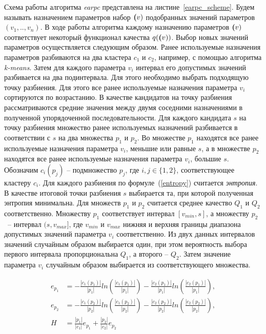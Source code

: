 Схема работы алгоритма \textit{earpc} представлена на листине~\ref{earpc_scheme}. Будем называть назначением параметров набор $\textbf(v)$ подобранных значений параметров $(v_1, .., v_n)$. В ходе работы алгоритма каждому назначению параметров $\textbf(v)$ соответствует некоторый функционал качества $q(\textbf(v))$. Выбор новых значений параметров осуществляется следующим образом. Ранее используемые назначения параметров разбиваются на два кластера $c_1$ и $c_2$, например, с помощью алгоритма \textit{k-means}. Затем для каждого параметра $v_i$ интервал его допустимых значений разбивается на два подинтервала. Для этого необходимо выбрать подходящую точку разбиения. Для этого все ранее используемые назначения параметра $v_i$ сортируются по возрастанию. В качестве кандидатов на точку разбиения рассматриваются средние значения между двумя соседними назначениями в полученной упорядоченной последовательности. Для каждого кандидата $s$ на точку разбиения  множество ранее используемых назначений разбивается в соответствии с $s$ на два множества $p_1$ и $p_2$. Во множестве $p_1$ находятся все ранее используемые назначения параметра $v_i$, меньшие или равные $s$, а в множестве $p_2$ находятся все ранее используемые назначения параметра $v_i$, большие $s$. 
Обозначим $c_i(p_j)$ -- подмножество $p_j$, где $i, j \in \{1, 2\}$,  соответствующее кластеру $c_i$. Для каждого разбиения по формуле~(\ref{entropy}) считается \textit{энтропия}. В качестве итоговой точки разбиения $s$ выбирается та, при которой полученная энтропия минимальна. Для множеств $p_1$ и $p_2$ считается среднее качество $Q_1$ и $Q_2$ соответственно. Множеству $p_1$ соответствует интервал $[v_{min}, s]$, а множеству $p_2$~-- интервал $(s, v_{max}]$, где $v_{min}$ и $v_{max}$ нижняя и верхняя границы диапазона допустимых значений параметра $v_{i}$ соответственно. Из двух данных интервалов значений случайным образом выбирается один, при этом вероятность выбора первого интервала пропорциональна $Q_1$, а второго -- $Q_2$. Затем значение параметра $v_i$ случайным образом выбирается из соответствующего множества. 

\begin{align}
\label{entropy}
e_{p_1} & = -\frac{|c_1(p_1)|}{|p_1|}ln(\frac{|c_1(p_1)|}{|p_1|}) -\frac{|c_2(p_1)|}{|p_1|}ln(\frac{|c_2(p_1)|}{|p_1|}), \nonumber \\
e_{p_2} & = -\frac{|c_1(p_2)|}{|p_2|}ln(\frac{|c_1(p_2)|}{|p_2|}) -\frac{|c_2(p_2)|}{|p_2|}ln(\frac{|c_2(p_2)|}{|p_2|}), \\
H & = \frac{|p_1|}{|c_1|}e_{p_1} + \frac{|p_2|}{|c_2|}e_{p_2} \nonumber 
\end{align}


